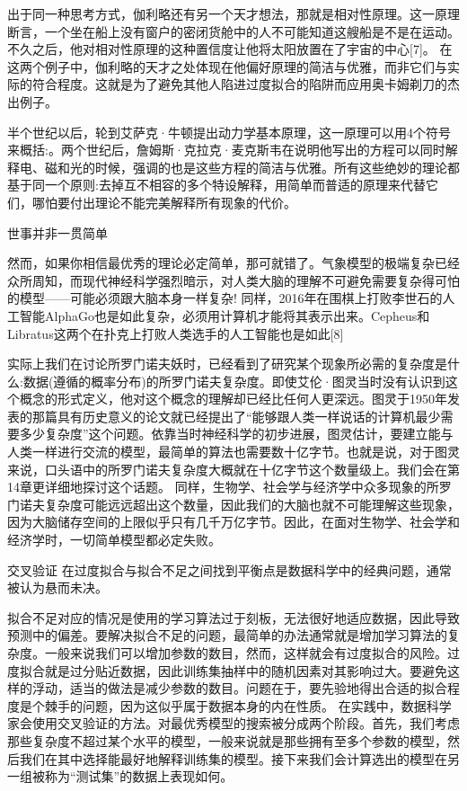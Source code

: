 出于同一种思考方式，伽利略还有另一个天才想法，那就是相对性原理。这一原理断言，一个坐在船上没有窗户的密闭货舱中的人不可能知道这艘船是不是在运动。
不久之后，他对相对性原理的这种置信度让他将太阳放置在了宇宙的中心[7]。
在这两个例子中，伽利略的天才之处体现在他偏好原理的简洁与优雅，而非它们与实际的符合程度。这就是为了避免其他人陷进过度拟合的陷阱而应用奥卡姆剃刀的杰出例子。

半个世纪以后，轮到艾萨克·牛顿提出动力学基本原理，这一原理可以用4个符号来概括:。两个世纪后，詹姆斯·克拉克·麦克斯韦在说明他写出的方程可以同时解释电、磁和光的时候，强调的也是这些方程的简洁与优雅。所有这些绝妙的理论都基于同一个原则:去掉互不相容的多个特设解释，用简单而普适的原理来代替它们，哪怕要付出理论不能完美解释所有现象的代价。



世事并非一贯简单

然而，如果你相信最优秀的理论必定简单，那可就错了。气象模型的极端复杂已经众所周知，而现代神经科学强烈暗示，对人类大脑的理解不可避免需要复杂得可怕的模型——可能必须跟大脑本身一样复杂!
同样，2016年在围棋上打败李世石的人工智能AlphaGo也是如此复杂，必须用计算机才能将其表示出来。Cepheus和Libratus这两个在扑克上打败人类选手的人工智能也是如此[8]

实际上我们在讨论所罗门诺夫妖时，已经看到了研究某个现象所必需的复杂度是什么:数据(遵循的概率分布)的所罗门诺夫复杂度。即使艾伦·图灵当时没有认识到这个概念的形式定义，他对这个概念的理解却已经比任何人更深远。图灵于1950年发表的那篇具有历史意义的论文就已经提出了“能够跟人类一样说话的计算机最少需要多少复杂度”这个问题。依靠当时神经科学的初步进展，图灵估计，要建立能与人类一样进行交流的模型，最简单的算法也需要数十亿字节。也就是说，对于图灵来说，口头语中的所罗门诺夫复杂度大概就在十亿字节这个数量级上。我们会在第14章更详细地探讨这个话题。
同样，生物学、社会学与经济学中众多现象的所罗门诺夫复杂度可能远远超出这个数量，因此我们的大脑也就不可能理解这些现象，因为大脑储存空间的上限似乎只有几千万亿字节。因此，在面对生物学、社会学和经济学时，一切简单模型都必定失败。

交叉验证
在过度拟合与拟合不足之间找到平衡点是数据科学中的经典问题，通常被认为悬而未决。

拟合不足对应的情况是使用的学习算法过于刻板，无法很好地适应数据，因此导致预测中的偏差。要解决拟合不足的问题，最简单的办法通常就是增加学习算法的复杂度。一般来说我们可以增加参数的数目，然而，这样就会有过度拟合的风险。过度拟合就是过分贴近数据，因此训练集抽样中的随机因素对其影响过大。要避免这样的浮动，适当的做法是减少参数的数目。问题在于，要先验地得出合适的拟合程度是个棘手的问题，因为这似乎属于数据本身的内在性质。
在实践中，数据科学家会使用交叉验证的方法。对最优秀模型的搜索被分成两个阶段。首先，我们考虑那些复杂度不超过某个水平的模型，一般来说就是那些拥有至多个参数的模型，然后我们在其中选择能最好地解释训练集的模型。接下来我们会计算选出的模型在另一组被称为“测试集”的数据上表现如何。

